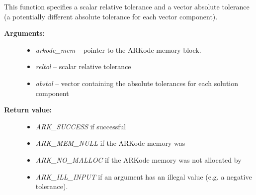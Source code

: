 \documentclass[letterpaper,10pt,english]{sphinxmanual}
\begin{document}
\begin{fulllineitems}
\label{c_interface/User_callable:ARKodeSVtolerances}
This function specifies a scalar relative tolerance and a vector
absolute tolerance (a potentially different absolute tolerance for
each vector component).
\begin{description}
\item[{\textbf{Arguments:}}] \leavevmode\begin{itemize}
\item {} 
\emph{arkode\_mem} -- pointer to the ARKode memory block.

\item {} 
\emph{reltol} -- scalar relative tolerance

\item {} 
\emph{abstol} -- vector containing the absolute tolerances for each
solution component

\end{itemize}

\item[{\textbf{Return value:}}] \leavevmode\begin{itemize}
\item {} 
\emph{ARK\_SUCCESS} if successful

\item {} 
\emph{ARK\_MEM\_NULL}  if the ARKode memory was 

\item {} 
\emph{ARK\_NO\_MALLOC}  if the ARKode memory was not allocated by {\hyperref[c_interface/User_callable:ARKodeInit]{}}

\item {} 
\emph{ARK\_ILL\_INPUT} if an argument has an illegal value (e.g. a negative tolerance).

\end{itemize}

\end{description}

\end{fulllineitems}

\end{document}
